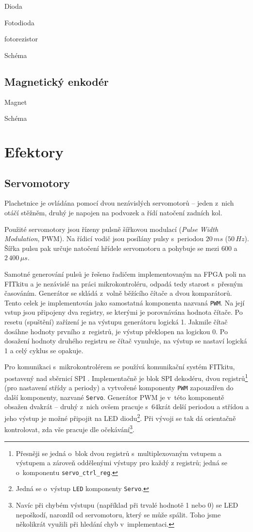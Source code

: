 Dioda

Fotodioda

fotorezistor

Schéma

\subsection{Magnetický enkodér}

Magnet

Schéma
\section{Efektory}

\subsection{Servomotory}
Plachetnice je ovládána pomocí dvou nezávislých servomotorů -- jeden z~nich
otáčí stěžněm, druhý je napojen na podvozek a řídí natočení zadních kol.

Použité servomotory jsou řízeny pulsně šířkovou modulací (\emph{Pulse Width
Modulation}, PWM). Na řídicí vodič jsou posílány pulsy s~periodou $20\,ms$
($50\,Hz$). Šířka pulsu pak určuje natočení hřídele servomotoru a pohybuje se
mezi $600$ a $2\,400\,\mu{}s$. \cite{modelarska_stranka_dohledam_doma}

Samotné generování pulsů je řešeno řadičem implementovaným na FPGA poli na
FITkitu a je nezávislé na práci mikrokontroléru, odpadá tedy starost s~přesným
časováním. Generátor se skládá z~volně běžícího čítače a dvou komparátorů. Tento
celek je implementován jako samostatná komponenta nazvaná \texttt{PWM}. Na její
vstup jsou připojeny dva registry, se kterými je porovnávána hodnota čítače. Po
resetu (spuštění) zařízení je na výstupu generátoru logická 1. Jakmile čítač
dosáhne hodnoty prvního z~registrů, je výstup překlopen na logickou 0. Po
dosažení hodnoty druhého registru se čítač vynuluje, na výstup se nastaví
logická 1 a celý cyklus se opakuje.

Pro komunikaci s~mikrokontrolérem se používá komunikační systém FITkitu,
postavený nad sběrnicí SPI \cite{fitkit_communication}. Implementačně je blok SPI
dekodéru, dvou registrů\footnote{Přesněji se jedná o~blok dvou registrů
s~multiplexovaným vstupem a výstupem a zároveň oddělenými výstupy pro každý z
registrů; jedná se o~komponentu \texttt{servo\_ctrl\_reg}.} (pro nastavení střídy
a periody) a vytvořené komponenty \texttt{PWM} zapouzdřen do další komponenty,
nazvané \texttt{Servo}. Generátor PWM je v~této komponentě obsažen dvakrát --
druhý z~nich ovšem pracuje s~64krát delší periodou a střídou a jeho
výstup je možné připojit na LED diodu\footnote{Jedná se o~výstup \texttt{LED}
komponenty \texttt{Servo}.}. Při vývoji se tak dá orientačně kontrolovat, zda
vše pracuje dle očekávání\footnote{Navíc při chybém výstupu (například při
trvalé hodnotě 1 nebo 0) se LED nepoškodí, narozdíl od servomotoru, který se
může spálit. Toho jsme několikrát využili při hledání chyb v~implementaci.}.

